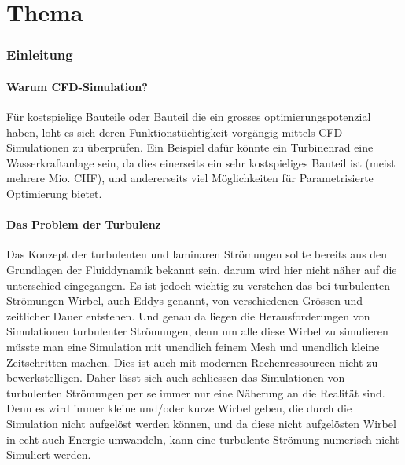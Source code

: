 %
%
%
%
\chapter{Thema\label{chapter:reynolds}}
\begin{refsection}

\subsection{Einleitung}

\subsubsection{Warum CFD-Simulation?}

Für kostspielige Bauteile oder Bauteil die ein grosses optimierungspotenzial haben,
loht es sich deren Funktionstüchtigkeit vorgängig mittels CFD Simulationen zu überprüfen.
Ein Beispiel dafür könnte ein Turbinenrad eine Wasserkraftanlage sein,
da dies einerseits ein sehr kostspieliges Bauteil ist (meist mehrere Mio. CHF),
und andererseits viel Möglichkeiten für Parametrisierte Optimierung bietet.

\subsubsection{Das Problem der Turbulenz}

Das Konzept der turbulenten und laminaren Strömungen sollte bereits aus den Grundlagen der Fluiddynamik bekannt sein, darum wird hier nicht näher auf die unterschied eingegangen.
Es ist jedoch wichtig zu verstehen das bei turbulenten Strömungen Wirbel, auch Eddys genannt, von verschiedenen Grössen und zeitlicher Dauer entstehen.
Und genau da liegen die Herausforderungen von Simulationen turbulenter Strömungen,
denn um alle diese Wirbel zu simulieren müsste man eine Simulation mit unendlich feinem Mesh und unendlich kleine Zeitschritten machen.
Dies ist auch mit modernen Rechenressourcen nicht zu bewerkstelligen.
Daher lässt sich auch schliessen das Simulationen von turbulenten Strömungen per se immer nur eine Näherung an die Realität sind.
Denn es wird immer kleine und/oder kurze Wirbel geben, die durch die Simulation nicht aufgelöst werden können,
und da diese nicht aufgelösten Wirbel in echt auch Energie umwandeln, kann eine turbulente Strömung numerisch nicht Simuliert werden.


\end{refsection}
